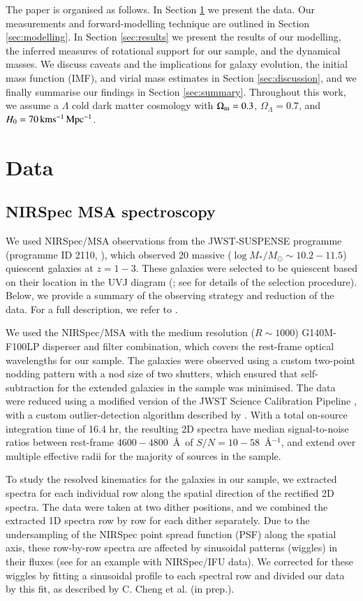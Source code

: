 \documentclass{aa}
\begin{document}
The paper is organised as follows. In Section \ref{sec:data} we present the data. Our measurements and forward-modelling technique are outlined in Section \ref{sec:modelling}. In Section \ref{sec:results} we present the results of our modelling, the inferred measures of rotational support for our sample, and the dynamical masses. We discuss caveats and the implications for galaxy evolution, the initial mass function (IMF), and virial mass estimates in Section \ref{sec:discussion}, and we finally summarise our findings in Section \ref{sec:summary}. Throughout this work, we assume a $\Lambda$ cold dark matter cosmology with $\Omega_{\rm m}= 0.3$, $\Omega_\Lambda=0.7$, and $H_0 =70\rm \, km s^{-1} \,Mpc^{-1}$.

\section{Data}\label{sec:data}
\subsection{NIRSpec MSA spectroscopy}
We used NIRSpec/MSA observations from the JWST-SUSPENSE programme (programme ID 2110, \citealt{MSlob2024}), which observed 20 massive ($\log M_*/M_{\odot} \sim 10.2-11.5$) quiescent galaxies at $z = 1-3$. These galaxies were selected to be quiescent based on their location in the UVJ diagram (\citealt{AMuzzin2013}; see \citealt{MSlob2024} for details of the selection procedure). Below, we provide a summary of the observing strategy and reduction of the data. For a full description, we refer to \citet{MSlob2024}.

We used the NIRSpec/MSA with the medium resolution ($R\sim1000$) G140M-F100LP disperser and filter combination, which covers the rest-frame optical wavelengths for our sample. The galaxies were observed using a custom two-point nodding pattern with a nod size of two shutters, which ensured that self-subtraction for the extended galaxies in the sample was minimised. The data were reduced using a modified version of the JWST Science Calibration Pipeline \citep{HBushouse2023}, with a custom outlier-detection algorithm described by \citet{MSlob2024}. With a total on-source integration time of 16.4 hr, the resulting 2D spectra have median signal-to-noise ratios between rest-frame $4600-4800$~\AA\ of $S/N=10-58$~\AA$^{-1}$, and extend over multiple effective radii for the majority of sources in the sample.

To study the resolved kinematics for the galaxies in our sample, we extracted spectra for each individual row along the spatial direction of the rectified 2D spectra. The data were taken at two dither positions, and we combined the extracted 1D spectra row by row for each dither separately. Due to the undersampling of the NIRSpec point spread function (PSF) along the spatial axis, these row-by-row spectra are affected by sinusoidal patterns (wiggles) in their fluxes (see \citealt{MPerna2023} for an example with NIRSpec/IFU data). We corrected for these wiggles by fitting a sinusoidal profile to each spectral row and divided our data by this fit, as described by C. Cheng et al. (in prep.). 
\end{document}
